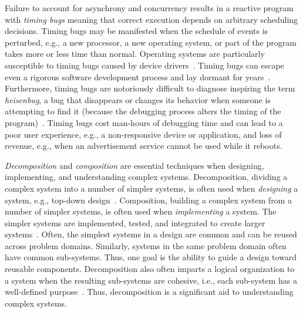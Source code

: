 Failure to account for asynchrony and concurrency results in a reactive program with \emph{timing bugs} meaning that correct execution depends on arbitrary scheduling decisions.
Timing bugs may be manifested when the schedule of events is perturbed, e.g., a new processor, a new operating system, or part of the program takes more or less time than normal.
Operating systems are particularly susceptible to timing bugs caused by device drivers~\cite{ryzhyk2009dingo}.
Timing bugs can escape even a rigorous software development process and lay dormant for years~\cite{lee2006problem}.
Furthermore, timing bugs are notoriously difficult to diagnose inspiring the term \emph{heisenbug}, a bug that disappears or changes its behavior when someone is attempting to find it (because the debugging process alters the timing of the program)~\cite{1983proceedings}.
Timing bugs cost man-hours of debugging time and can lead to a poor user experience, e.g., a non-responsive device or application, and loss of revenue, e.g., when an advertisement service cannot be used while it reboots.

\emph{Decomposition} and \emph{composition} are essential techniques when designing, implementing, and understanding complex systems.
Decomposition, dividing a complex system into a number of simpler systems, is often used when \emph{designing} a system, e.g., top-down design~\cite{wirth1971program}.
Composition, building a complex system from a number of simpler systems, is often used when \emph{implementing} a system.
The simpler systems are implemented, tested, and integrated to create larger systems~\cite{brooks1995mythical}.
Often, the simplest systems in a design are common and can be reused across problem domains.
Similarly, systems in the same problem domain often have common sub-systems.
Thus, one goal is the ability to guide a design toward reusable components.
Decomposition also often imparts a logical organization to a system when the resulting sub-systems are cohesive, i.e., each sub-system has a well-defined purpose~\cite{parnas1972criteria}.
Thus, decomposition is a significant aid to understanding complex systems.

